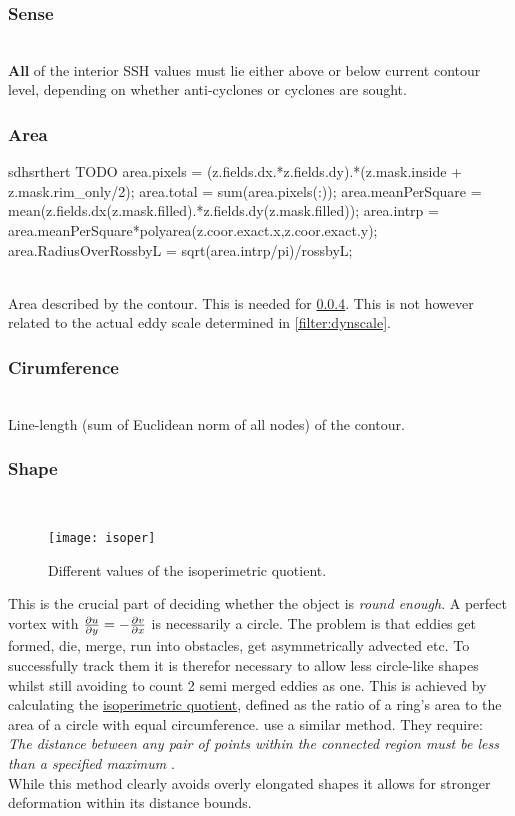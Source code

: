 \subsubsection{Sense}
\\
\textbf{All} of the interior SSH values must lie either above or below current
contour level, depending on whether anti-cyclones or cyclones are sought.
\subsubsection{Area} \label{filter:area}

sdhsrthert TODO
 area.pixels = (z.fields.dx.*z.fields.dy).*(z.mask.inside + z.mask.rim_only/2);  %
    area.total = sum(area.pixels(:));
    area.meanPerSquare = mean(z.fields.dx(z.mask.filled).*z.fields.dy(z.mask.filled));
    area.intrp = area.meanPerSquare*polyarea(z.coor.exact.x,z.coor.exact.y);
    area.RadiusOverRossbyL = sqrt(area.intrp/pi)/rossbyL;

\\
Area described by the contour. This is needed for \ref{filter:shape}. This is
not however related to the actual eddy scale determined in
\ref{filter:dynscale}.
\subsubsection{Cirumference}
\\
Line-length (sum of Euclidean norm of all nodes) of the contour.
\newpage
\subsubsection{Shape}\label{filter:shape}
\\
\begin{wrapfigure}{r}{0.4\textwidth}
	\texttt{[image: isoper]}
	\caption{Different values of the isoperimetric quotient.}
	\label{fig:isoper}
\end{wrapfigure}

This is the crucial part of deciding whether the object is \textit{round
enough}. A perfect vortex with $\frac{\partial u}{\partial y}=-\frac{\partial v}{\partial x}$ is necessarily a
circle. The problem is that eddies get formed, die, merge, run into obstacles,
get asymmetrically advected etc. To successfully track them it is therefor
necessary to allow less circle-like shapes whilst still avoiding to \eg count 2
semi merged eddies as one. 
This is achieved by calculating the \hyperref[def:IQ]{isoperimetric quotient},
defined as the ratio of a ring's area to the area of a circle with equal
circumference. \cite{Chelton2011} use a similar method. They
require:\\ \textit{The distance between any pair of points within the connected
region must be less than a specified maximum} \citep{Chelton2011}.\\
While this method clearly avoids overly elongated shapes it allows for stronger
deformation within its distance bounds. 
